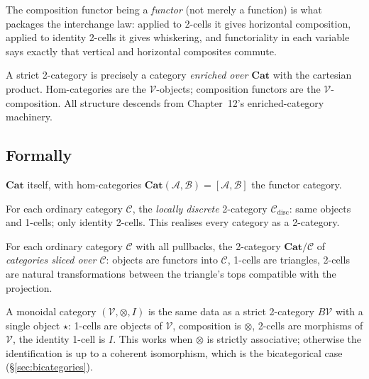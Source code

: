 The composition functor being a \emph{functor} (not merely a function) is
what packages the interchange law: applied to 2-cells it gives horizontal
composition, applied to identity 2-cells it gives whiskering, and functoriality
in each variable says exactly that vertical and horizontal composites commute.

\begin{remark}
A strict 2-category is precisely a category \emph{enriched over $\mathbf{Cat}$}
with the cartesian product. Hom-categories are the $\mathcal{V}$-objects;
composition functors are the $\mathcal{V}$-composition. All structure
descends from Chapter~12's enriched-category machinery.
\end{remark}

\subsection{Formally}

\begin{example_thm}
$\mathbf{Cat}$ itself, with hom-categories $\mathbf{Cat}(\mathcal{A}, \mathcal{B})
= [\mathcal{A}, \mathcal{B}]$ the functor category.
\end{example_thm}

\begin{example_thm}
For each ordinary category $\mathcal{C}$, the \emph{locally discrete} 2-category
$\mathcal{C}_{\mathrm{disc}}$: same objects and 1-cells; only identity 2-cells.
This realises every category as a 2-category.
\end{example_thm}

\begin{example_thm}
For each ordinary category $\mathcal{C}$ with all pullbacks, the 2-category
$\mathbf{Cat}/\mathcal{C}$ of \emph{categories sliced over $\mathcal{C}$}:
objects are functors into $\mathcal{C}$, 1-cells are triangles, 2-cells are
natural transformations between the triangle's tops compatible with the
projection.
\end{example_thm}

\begin{example_thm}
A monoidal category $(\mathcal{V}, \otimes, I)$ is the same data as a strict
2-category $B\mathcal{V}$ with a single object $\star$: 1-cells are objects
of $\mathcal{V}$, composition is $\otimes$, 2-cells are morphisms of
$\mathcal{V}$, the identity 1-cell is $I$. This works when $\otimes$ is
strictly associative; otherwise the identification is up to a coherent
isomorphism, which is the bicategorical case (\S\ref{sec:bicategories}).
\end{example_thm}


